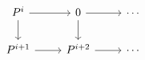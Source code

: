 \documentclass[12pt]{standalone}
\begin{document}
        $$

\begin{tikzcd}
    P^i \ar[r] \ar[d] & 0 \ar[r] \ar[d] & \cdots \\
    P^{i+1} \ar[r] & P^{i+2} \ar[r] & \cdots 
\end{tikzcd}
        $$
        
\end{document}
